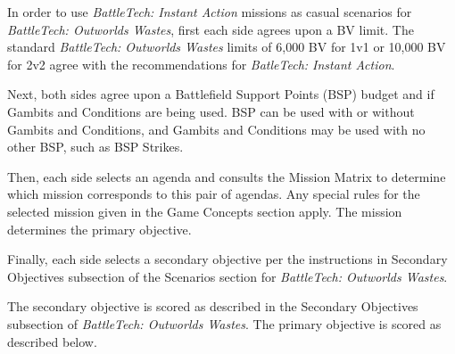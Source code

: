 In order to use \emph{BattleTech: Instant Action} missions as casual scenarios for \emph{BattleTech: Outworlds Wastes}, first each side agrees upon a BV limit.
The standard \emph{BattleTech: Outworlds Wastes} limits of 6,000 BV for 1v1 or 10,000 BV for 2v2 agree with the recommendations for \emph{BatleTech: Instant Action}.

Next, both sides agree upon a Battlefield Support Points (BSP) budget and if Gambits and Conditions are being used.
BSP can be used with or without Gambits and Conditions, and Gambits and Conditions may be used with no other BSP, such as BSP Strikes.

Then, each side selects an agenda and consults the Mission Matrix to determine which mission corresponds to this pair of agendas.
Any special rules for the selected mission given in the Game Concepts section apply.
The mission determines the primary objective.

Finally, each side selects a secondary objective per the instructions in Secondary Objectives subsection of the Scenarios section for \emph{BattleTech: Outworlds Wastes}.

The secondary objective is scored as described in the Secondary Objectives subsection of \emph{BattleTech: Outworlds Wastes}.
The primary objective is scored as described below.

